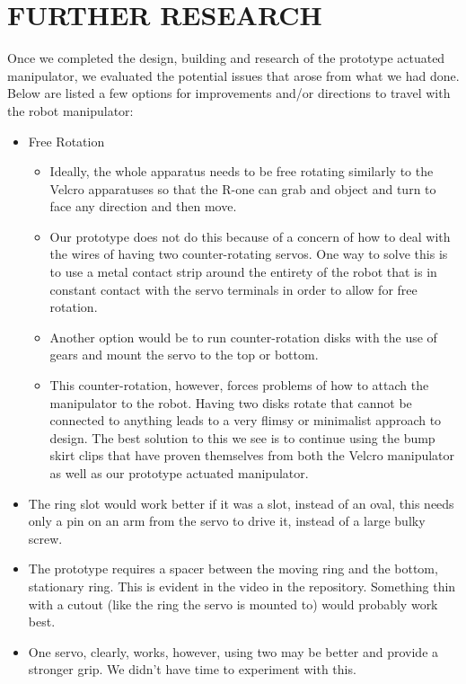 \section{FURTHER RESEARCH}
\label{sec:Further}

Once we completed the design, building and research of the prototype actuated manipulator, we evaluated the potential issues that arose from what we had done. Below are listed a few options for improvements and/or directions to travel with the robot manipulator:
\begin{itemize}
\item Free Rotation
\begin{itemize}
\item Ideally, the whole apparatus needs to be free rotating similarly to the Velcro apparatuses so that the R-one can grab and object and turn to face any direction and then move.
\item Our prototype does not do this because of a concern of how to deal with the wires of having two counter-rotating servos. One way to solve this is to use a metal contact strip around the entirety of the robot that is in constant contact with the servo terminals in order to allow for free rotation.
\item Another option would be to run counter-rotation disks with the use of gears and mount the servo to the top or bottom.
\item This counter-rotation, however, forces problems of how to attach the manipulator to the robot. Having two disks rotate that cannot be connected to anything leads to a very flimsy or minimalist approach to design. The best solution to this we see is to continue using the bump skirt clips that have proven themselves from both the Velcro manipulator as well as our prototype actuated manipulator. 
\end{itemize}
\item The ring slot would work better if it was a slot, instead of an oval, this needs only a pin on an arm from the servo to drive it, instead of a large bulky screw.
\item The prototype requires a spacer between the moving ring and the bottom, stationary ring. This is evident in the video in the repository. Something thin with a cutout (like the ring the servo is mounted to) would probably work best.
\item One servo, clearly, works, however, using two may be better and provide a stronger grip. We didn't have time to experiment with this. 
\begin{itemize}

\end{itemize}
\end{itemize}
